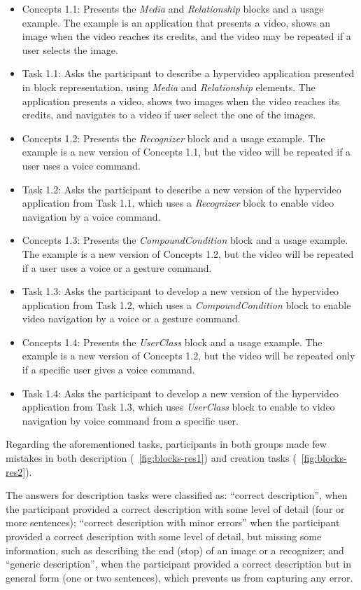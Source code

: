 \documentclass[
  doutorado,
  american
]{ThesisPUC}
\newcommand{\fig}[1]{\figurename~\ref{#1}}
\begin{document}
\begin{itemize}
	\item Concepts 1.1: Presents the \textit{Media} and \textit{Relationship}
	blocks and a usage example. The example is an application that presents a
	video, shows an image when the video reaches its credits, and the video may be
	repeated if a user selects the image.
	\item Task 1.1: Asks the participant to describe a hypervideo application
	presented in block representation, using \textit{Media} and
	\textit{Relationship} elements. The application presents a video, shows two
	images when the video reaches its credits, and navigates to a video if user
	select the one of the images.
	\item Concepts 1.2: Presents the \textit{Recognizer} block and a usage
	example. The example is a new version of Concepts 1.1, but the video will be
	repeated if a user uses a voice command.
	\item Task 1.2: Asks the participant to describe a new version of the
	hypervideo application from Task 1.1, which uses a \textit{Recognizer} block
	to enable video navigation by a voice command. 
	\item Concepts 1.3: Presents the \textit{CompoundCondition} block and a usage
	example. The example is a new version of Concepts 1.2, but the video will be
	repeated if a user uses a voice or a gesture command.
	\item Task 1.3: Asks the participant to develop a new version of the
	hypervideo application from Task 1.2, which uses a \textit{CompoundCondition}
	block to enable video navigation by a voice or a gesture command.
	\item Concepts 1.4: Presents the \textit{UserClass} block and a usage example.
	The example is a new version of Concepts 1.2, but the video will be repeated
	only if a specific user gives a voice command.
	\item Task 1.4: Asks the participant to develop a new version of the
	hypervideo application from Task 1.3, which uses \textit{UserClass} block to
	enable to video navigation by voice command from a specific user.
\end{itemize}

Regarding the aforementioned tasks, participants in both groups made few
mistakes in both description (\fig{fig:blocks-res1}) and creation tasks
(\fig{fig:blocks-res2}). 

The answers for description tasks were classified as: “correct description”,
when the participant provided a correct description with some level of detail
(four or more sentences); “correct description with minor errors” when the
participant provided a correct description with some level of detail, but
missing some information, such as describing the end (stop) of an image or a
recognizer; and “generic description”, when the participant provided a correct
description but in general form (one or two sentences), which prevents us from
capturing any error.
\end{document}
